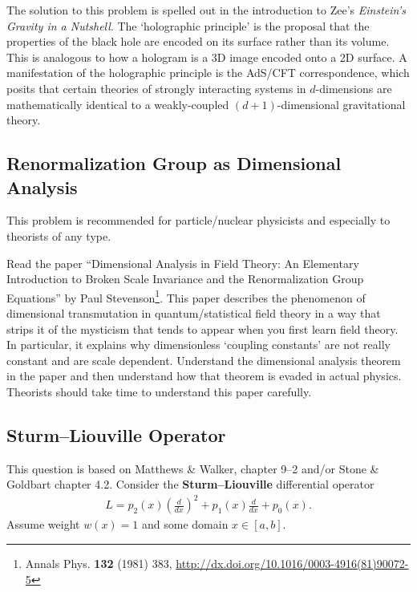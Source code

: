 \documentclass[12pt]{article}
\numberwithin{equation}{subsection}    %
\begin{document}
The solution to this problem is spelled out in  the introduction to Zee's \emph{Einstein's Gravity in a Nutshell}. The `holographic principle' is the proposal that the properties of the black hole are encoded on its surface rather than its volume. This is analogous to how a hologram is a 3D image encoded onto a 2D surface. A manifestation of the holographic principle is the AdS/CFT correspondence, which posits that certain theories of strongly interacting systems in $d$-dimensions are mathematically identical to a weakly-coupled $(d+1)$-dimensional gravitational theory.




\subsection{Renormalization Group as Dimensional Analysis}

This problem is recommended for particle/nuclear physicists and especially to theorists of any type.

Read the paper ``Dimensional Analysis in Field Theory: An Elementary Introduction to Broken Scale Invariance and the Renormalization Group Equations'' by Paul Stevenson\footnote{Annals Phys. \textbf{132} (1981) 383, \url{http://dx.doi.org/10.1016/0003-4916(81)90072-5}}. This paper describes the phenomenon of dimensional transmutation in quantum/statistical field theory in a way that strips it of the mysticism that tends to appear when you first learn field theory. In particular, it explains why dimensionless `coupling constants' are not really constant and are scale dependent. Understand the  dimensional analysis theorem in the paper and then understand how that theorem is evaded in actual physics. Theorists should take time to understand this paper carefully.\


\subsection{Sturm--Liouville Operator}

This question is based on Matthews \& Walker, chapter 9--2 and/or Stone \& Goldbart chapter 4.2. Consider the \textbf{Sturm--Liouville} differential operator
\begin{align}
	L = p_2(x) \left(\frac{d}{dx}\right)^2
	+ p_1(x)\frac{d}{dx}
	+ p_0(x) .
\end{align}
Assume weight $w(x) = 1$ and some domain $x\in [a,b]$.

\end{document}
